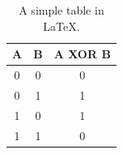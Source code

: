 \begin{table}[ht]
\center
\begin{tabular}{cc|c}
A & B & A XOR B\\
\hline
0 & 0 & 0\\
0 & 1 & 1\\
1 & 0 & 1\\
1 & 1 & 0\\
\end{tabular}
\caption{A simple table in \LaTeX.}
\label{tab:xor}
\end{table}